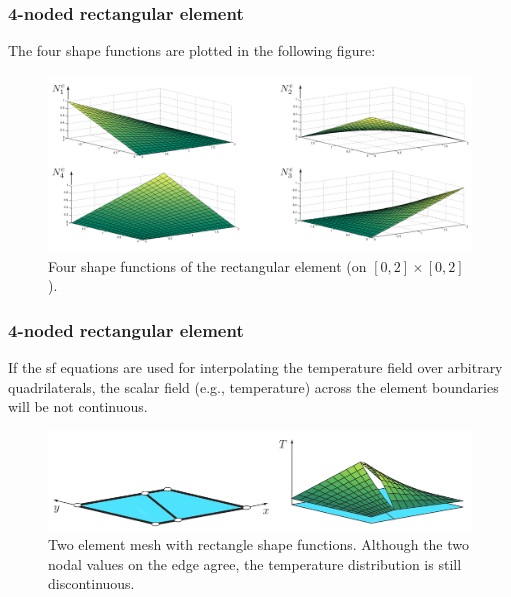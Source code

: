 \documentclass[notes]{beamer}
\begin{document}
\begin{frame}
\frametitle{4-noded rectangular element}
The four shape functions are plotted in the following
figure:
\begin{figure}[ht]
	\centering
	\includegraphics[width=\textwidth]{figs/4noded-sf.png}
	\caption*{Four shape functions of the rectangular element (on $[0, 2] \times [0, 2]$).}
\end{figure}
\end{frame}


\begin{frame}
\frametitle{4-noded rectangular element}
If the sf equations are used for interpolating the temperature field over arbitrary quadrilaterals, the scalar field (e.g., temperature) across the element boundaries will be not continuous.
\begin{figure}[ht]
	\centering
	\includegraphics[width=\textwidth]{figs/discontinous-rectangle.png}
	\caption*{Two element mesh with rectangle shape functions. Although the two nodal values on the
		edge agree, the temperature distribution is still discontinuous.}
\end{figure}
\end{frame}

\end{document}
